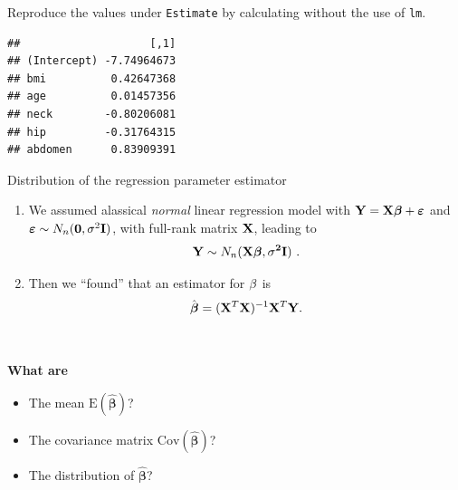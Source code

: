 \documentclass[10pt,ignorenonframetext,]{beamer}
\newenvironment{Shaded}{\begin{snugshade}}{\end{snugshade}}
\newcommand{\KeywordTok}[1]{\textcolor[rgb]{0.13,0.29,0.53}{\textbf{#1}}}
\newcommand{\StringTok}[1]{\textcolor[rgb]{0.31,0.60,0.02}{#1}}
\newcommand{\OperatorTok}[1]{\textcolor[rgb]{0.81,0.36,0.00}{\textbf{#1}}}
\newcommand{\NormalTok}[1]{#1}
\providecommand{\tightlist}{%
  \setlength{\itemsep}{0pt}\setlength{\parskip}{0pt}}
\begin{document}
\begin{frame}[fragile]

Reproduce the values under \texttt{Estimate} by calculating without the
use of \texttt{lm}.

\begin{Shaded}
\end{Shaded}

\begin{verbatim}
##                    [,1]
## (Intercept) -7.74964673
## bmi          0.42647368
## age          0.01457356
## neck        -0.80206081
## hip         -0.31764315
## abdomen      0.83909391
\end{verbatim}

\end{frame}

\begin{frame}

\begin{block}{Distribution of the regression parameter estimator}

\begin{enumerate}
\def\labelenumi{\arabic{enumi}.}
\tightlist
\item
  We assumed alassical \emph{normal} linear regression model with
  \({\bf Y=X \boldsymbol\beta}+{\boldsymbol \varepsilon}\) and
  \(\boldsymbol\varepsilon\sim N_n({\bf 0},\sigma^2 {\bf I})\), with
  full-rank matrix \(\bf{X}\), leading to
  \[ {\bf Y} \sim N_{n}(\bf X \boldsymbol \beta,\sigma^2 {\bf I}) \ .\]
\item
  Then we ``found'' that an estimator for \({\bf \beta}\) is
  \[ \hat{\boldsymbol\beta}=({\bf X}^T{\bf X})^{-1} {\bf X}^T {\bf Y}.\]
\end{enumerate}

\(~\)

\textbf{What are}

\begin{itemize}
\tightlist
\item
  The mean \(\text{E}(\hat{\boldsymbol\beta})\)?
\item
  The covariance matrix \(\text{Cov}(\hat{\boldsymbol\beta})\)?
\item
  The distribution of \(\hat{\boldsymbol\beta}\)?
\end{itemize}

\end{block}

\end{frame}
\end{document}
